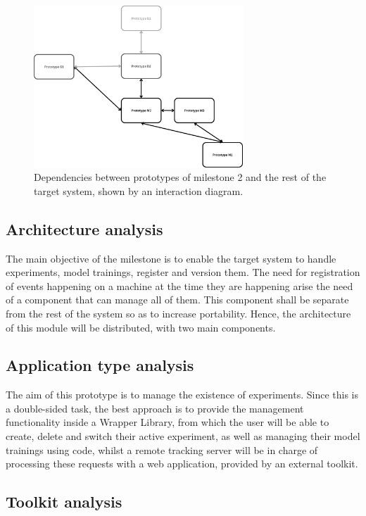 \begin{figure}[H]
    \centering
    \includegraphics[width=0.7\textwidth]{figs/M-dependencies.png}
    \caption{Dependencies between prototypes of milestone 2 and the rest of the target system, shown by an interaction diagram.}
\end{figure}

\subsection{Architecture analysis}

The main objective of the milestone is to enable the target system to handle experiments, model trainings, register and version them. The need for
registration of events happening on a machine at the time they are happening arise the need of a component that can manage all of them. This component
shall be separate from the rest of the system so as to increase portability. Hence, the architecture of this module will be distributed, with two main components.

\subsection{Application type analysis}

The aim of this prototype is to manage the existence of experiments. Since this is a double-sided task, the best approach is to provide the 
management functionality inside a Wrapper Library, from which the user will be able to create, delete and switch their active experiment, as well
as managing their model trainings using code, whilst a remote tracking server will be in charge of processing these requests with a web 
application, provided by an external toolkit.

\subsection{Toolkit analysis}

